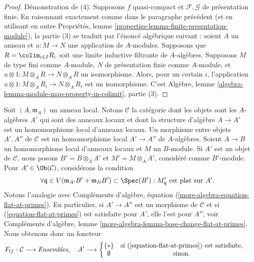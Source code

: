 \begin{proof}
\medskip\noindent
Démonstration de (4).
Supposons $f$ quasi-compact et $\mathcal{F}, \mathcal{G}$ de présentation finie.
En raisonnant exactement comme dans le paragraphe précédent
(et en utilisant en outre
Propriétés, lemme \ref{properties-lemma-finite-presentation-module}),
la partie (3) se traduit par l'énoncé algébrique suivant :
soient $A$ un anneau et $u : M \to N$ une application de $A$-modules.
Supposons que $R = \colim_{i \in I} R_i$ soit une limite inductive filtrante
de $A$-algèbres. Supposons $M$ de type fini comme $A$-module, $N$ de présentation
finie comme $A$-module, et
$u \otimes 1 : M \otimes_A R \to N \otimes_A R$ un isomorphisme.
Alors, pour un certain $i$, l'application
$u \otimes 1 : M \otimes_A R_i \to N \otimes_A R_i$ est un isomorphisme.
C'est
Algèbre, lemme \ref{algebra-lemma-module-map-property-in-colimit}, partie (3).
\end{proof}

\begin{situation}
\label{situation-flat-at-point}
Soit $(A, \mathfrak m_A)$ un anneau local.
Notons $\mathcal{C}$ la catégorie dont les objets sont les $A$-algèbres
$A'$ qui sont des anneaux locaux et dont la structure d'algèbre
$A \to A'$ est un homomorphisme local d'anneaux locaux.
Un morphisme entre objets $A', A''$ de $\mathcal{C}$ est un
homomorphisme local $A' \to A''$ de $A$-algèbres.
Soient $A \to B$ un homomorphisme local d'anneaux locaux et $M$ un $B$-module.
Si $A'$ est un objet de $\mathcal{C}$, nous posons $B' = B \otimes_A A'$
et $M' = M \otimes_A A'$, considéré comme $B'$-module.
Pour $A' \in \Ob(\mathcal{C})$, considérons la condition
\begin{equation}
\label{equation-flat-at-primes}
\forall \mathfrak q \in V(\mathfrak m_{A'}B' + \mathfrak m_B B')
\subset \Spec(B') :
M'_{\mathfrak q}\text{ est plat sur }A'.
\end{equation}
Notons l'analogie avec
Compléments d'algèbre, équation (\ref{more-algebra-equation-flat-at-primes}).
En particulier, si $A' \to A''$ est un morphisme de $\mathcal{C}$ et si
(\ref{equation-flat-at-primes}) est satisfaite pour $A'$, elle l'est pour $A''$, voir
Compléments d'algèbre,
lemme \ref{more-algebra-lemma-base-change-flat-at-primes}.
Nous obtenons donc un foncteur
\begin{equation}
\label{equation-flat-at-point}
F_{lf} : \mathcal{C} \longrightarrow \textit{Ensembles}, \quad
A' \longrightarrow \left\{
\begin{matrix}
\{*\} & \text{si }(\ref{equation-flat-at-primes})\text{ est satisfaite}, \\
\emptyset & \text{sinon.} &
\end{matrix}
\right.
\end{equation}
\end{situation}

